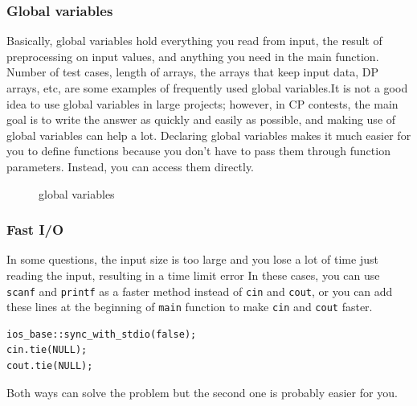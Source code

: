 \documentclass[12pt, a4paper]{article}
\begin{document}
\subsubsection{Global variables}
Basically, global variables hold everything you read from input, the result of preprocessing on input values, and anything you need in the main function. Number of test cases, length of arrays, the arrays that keep input data, DP arrays, etc, are some examples of frequently used global variables.It is not a good idea to use global variables in large projects; however, in CP contests, the main goal is to write the answer as quickly and easily as possible, and making use of global variables can help a lot. Declaring global variables makes it much easier for you to define functions because you don't have to pass them through function parameters. Instead, you can access them directly.

\begin{figure}[h]
\centering
{}
\caption{global variables}
\end{figure}


\subsubsection{Fast I/O}
In some questions, the input size is too large and you lose a lot of time just reading the input, resulting in a time limit error In these cases, you can use \lstinline{scanf} and \lstinline{printf} as a faster method instead of \lstinline{cin} and \lstinline{cout}, or you can add these lines at the beginning of \lstinline{main} function to make \lstinline{cin} and \lstinline{cout} faster.

\begin{lstlisting}
ios_base::sync_with_stdio(false); 
cin.tie(NULL); 
cout.tie(NULL);
\end{lstlisting}
Both ways can solve the problem but the second one is probably easier for you.
\end{document}
